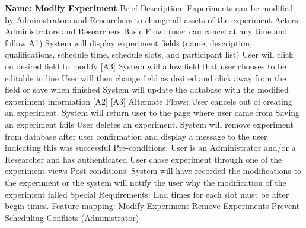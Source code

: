 \begin{outline}[enumerate]
\1 {\bf Name: Modify Experiment}
\2 Brief Description: Experiments can be modified by Administrators and Researchers to change all assets of the experiment
\2 Actors: Administrators and Researchers
\2 Basic Flow: (user can cancel at any time and follow A1)
\3 System will display experiment fields (name, description, qualifications, schedule time, schedule slots, and participant list)
\3 User will click on desired field to modify [A3]
\3 System will allow field that user chooses to be editable in line
\3 User will then change field as desired and click away from the field or save when finished
\3 System will update the database with the modified experiment information [A2] [A3]
\2 Alternate Flows:
\3 [A1] User cancels out of creating an experiment. System will return user to the page where user came from
\3 [A2] Saving an experiment fails
\3 [A3] User deletes an experiment. System will remove experiment from database after user confirmation and display a message to the user indicating this was successful
\2 Pre-conditions:
\3 User is an Administrator and/or a Researcher and has authenticated
\3 User chose experiment through one of the experiment views
\2 Post-conditions:
\3 System will have recorded the modifications to the experiment or the system will notify the user why the modification of the experiment failed
\2 Special Requirements:
\3 End times for each slot must be after begin times.
\2 Feature mapping:
\3 Modify Experiment
\3 Remove Experiments
\3 Prevent Scheduling Conflicts (Administrator)

\end{outline}
